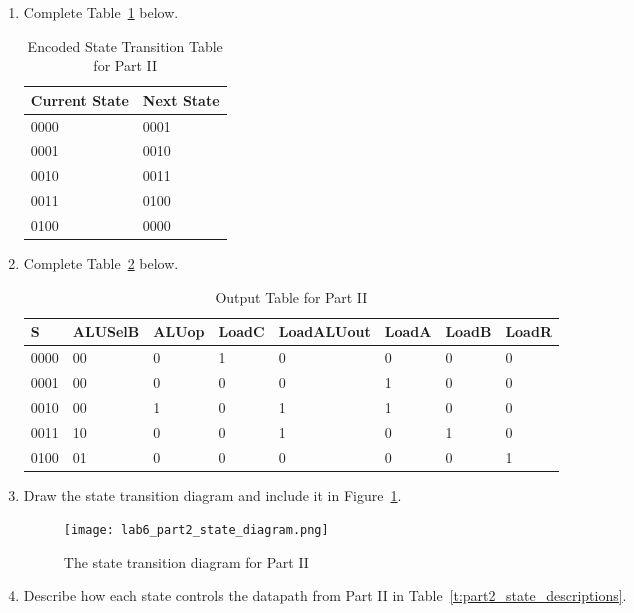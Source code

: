 \documentclass{article}
\begin{document}
\begin{enumerate}
\item Complete Table~\ref{t:part2_encoded_transition_table} below.

\begin{table}[ht!]
\caption{Encoded State Transition Table for Part II}
\label{t:part2_encoded_transition_table}
\centering
\begin{tabular}{|l|l|}
\hline
Current State & Next State \\ \hline
0000 & 0001\\
0001 & 0010\\
0010 & 0011\\
0011 & 0100\\
0100 & 0000\\
\hline
\end{tabular}
\end{table}
\item Complete Table~\ref{t:part2_output_table} below.

\begin{table}[ht!]
\caption{Output Table for Part II}
\label{t:part2_output_table}
\centering
\begin{tabular}{|l|l|l|l|l|l|l|l|}
\hline
S & ALUSelB & ALUop & LoadC & LoadALUout & LoadA & LoadB & LoadR\\ \hline
0000 & 00 & 0 & 1 & 0 & 0 & 0 & 0\\
0001 & 00 & 0 & 0 & 0 & 1 & 0 & 0\\
0010 & 00 & 1 & 0 & 1 & 1 & 0 & 0\\
0011 & 10 & 0 & 0 & 1 & 0 & 1 & 0\\
0100 & 01 & 0 & 0 & 0 & 0 & 0 & 1\\

\hline
\end{tabular}
\end{table}

\item Draw the state transition diagram and include it in Figure~\ref{f:part2_state_diagram}.

\begin{figure}[ht!]
    \centering
    \texttt{[image: lab6\_part2\_state\_diagram.png]}
    \caption{The state transition diagram for Part II}
    \label{f:part2_state_diagram}
\end{figure}

\item Describe how each state controls the datapath from Part II in Table~\ref{t:part2_state_descriptions}.


\end{enumerate}
\end{document}
